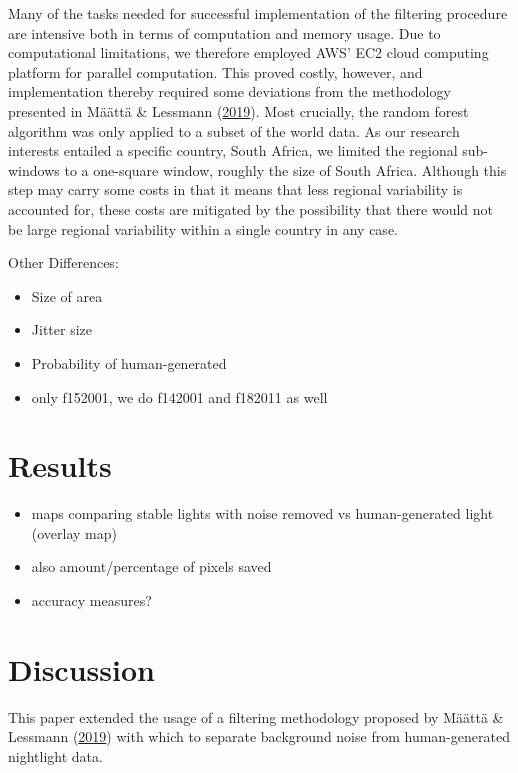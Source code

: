 \documentclass[11pt,preprint, authoryear]{elsarticle}
\numberwithin{equation}{section}
\numberwithin{figure}{section}
\numberwithin{table}{section}
\def\tightlist{} %
\begin{document}
Many of the tasks needed for successful implementation of the filtering
procedure are intensive both in terms of computation and memory usage.
Due to computational limitations, we therefore employed AWS' EC2 cloud
computing platform for parallel computation. This proved costly,
however, and implementation thereby required some deviations from the
methodology presented in Määttä \& Lessmann
(\protect\hyperlink{ref-maatta}{2019}). Most crucially, the random
forest algorithm was only applied to a subset of the world data. As our
research interests entailed a specific country, South Africa, we limited
the regional sub-windows to a one-square window, roughly the size of
South Africa. Although this step may carry some costs in that it means
that less regional variability is accounted for, these costs are
mitigated by the possibility that there would not be large regional
variability within a single country in any case.

Other Differences:

\begin{itemize}
\tightlist
\item
  Size of area
\item
  Jitter size
\item
  Probability of human-generated
\item
  only f152001, we do f142001 and f182011 as well
\end{itemize}

\hypertarget{results}{%
\section{\texorpdfstring{Results
\label{Results}}{Results }}\label{results}}

\begin{itemize}
\tightlist
\item
  maps comparing stable lights with noise removed vs human-generated
  light (overlay map)
\item
  also amount/percentage of pixels saved
\item
  accuracy measures?
\end{itemize}

\hypertarget{discussion}{%
\section{\texorpdfstring{Discussion
\label{Discussion}}{Discussion }}\label{discussion}}

This paper extended the usage of a filtering methodology proposed by
Määttä \& Lessmann (\protect\hyperlink{ref-maatta}{2019}) with which to
separate background noise from human-generated nightlight data.
\end{document}
